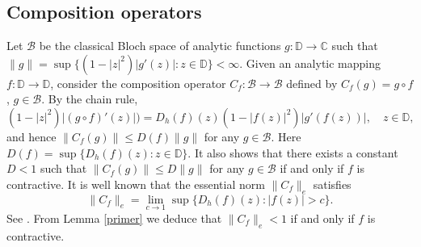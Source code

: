 \documentclass[a4paper,12pt]{article}
\theoremstyle{definition}
\numberwithin{equation}{section}
\newcommand{\D}{\mathbb D}
\begin{document}
\subsection{Composition operators}

Let $\mathcal{B}$ be the classical Bloch space of analytic functions $g: \D \rightarrow \mathbb{C}$ such that $\|g\| = \sup \{(1-|z|^2) |g' (z)| : z \in \D\} < \infty$. Given an analytic mapping $f: \D \rightarrow \D$, consider the composition operator $C_f : \mathcal{B} \rightarrow \mathcal{B}$ defined by $C_f (g) = g \circ f$, $g \in \mathcal{B}$. By the chain rule, 
\begin{equation}
    \label{comp}
    (1-|z|^2) |(g \circ f)' (z)|) = D_h (f) (z) (1-|f(z)|^2)|g' (f(z))| , \quad z \in \D, 
\end{equation}
and hence $\|C_f (g)\| \leq D(f) \|g \|$ for any $g \in \mathcal{B}$. Here $D(f) = \sup \{D_h (f) (z) : z \in \D \}$. It also shows that there exists a constant $D<1$ such that $\|C_f (g)\| \leq D \|g \|$ for any $g \in \mathcal{B}$ if and only if $f$ is contractive. It is well known that the essential norm $\|C_f\|_{e}$ satisfies 
$$
\|C_f\|_e = \lim_{c \to 1} \sup \{D_h (f) (z) : |f(z)|>c \}. 
$$
See \cite{Mon}. From Lemma \ref{primer} we deduce that $\|C_f \|_e < 1$ if and only if $f$ is contractive. 



\vspace{-4pt}
\end{document}
